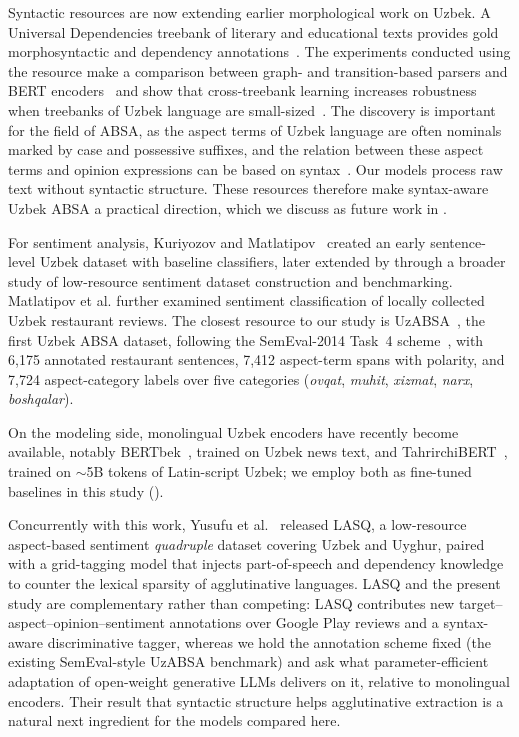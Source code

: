 \documentclass[bdcc,article,submit,moreauthors]{Definitions/mdpi}
\begin{document}
Syntactic resources are now extending earlier morphological work on Uzbek. A Universal Dependencies treebank of literary and educational texts provides gold morphosyntactic and dependency annotations~\cite{MATLATIPOV2026112857}. The experiments conducted using the resource make a comparison between graph- and transition-based parsers and BERT encoders~\cite{11632281} and show that cross-treebank learning increases robustness when treebanks of Uzbek language are small-sized~\cite{10.1007/978-3-032-29532-3_15}. The discovery is important for the field of ABSA, as the aspect terms of Uzbek language are often nominals marked by case and possessive suffixes, and the relation between these aspect terms and opinion expressions can be based on syntax~\cite{Yusufu2026}. Our models process raw text without syntactic structure. These resources therefore make syntax-aware Uzbek ABSA a practical direction, which we discuss as future work in .

For sentiment analysis, Kuriyozov and Matlatipov~\cite{proceedings2019021037} created an early sentence-level Uzbek dataset with baseline classifiers, later extended by \cite{kuriyozov2022construction} through a broader study of low-resource sentiment dataset construction and benchmarking. Matlatipov et al.\cite{Matlatipov2022-yd} further examined sentiment classification of locally collected Uzbek restaurant reviews. The closest resource to our study is UzABSA~\cite{matlatipov-etal-2024-uzabsa}, the first Uzbek ABSA dataset, following the SemEval-2014 Task~4 scheme~\cite{pontiki-etal-2014-semeval}, with 6{,}175 annotated restaurant sentences, 7{,}412 aspect-term spans with polarity, and 7{,}724 aspect-category labels over five categories (\textit{ovqat}, \textit{muhit}, \textit{xizmat}, \textit{narx}, \textit{boshqalar}).

On the modeling side, monolingual Uzbek encoders have recently become available, notably BERTbek~\cite{kuriyozov-etal-2024-bertbek}, trained on Uzbek news text, and TahrirchiBERT~\cite{tahrirchibert2023}, trained on $\sim$5B tokens of Latin-script Uzbek; we employ both as fine-tuned baselines in this study ().

Concurrently with this work, Yusufu et al.~\cite{Yusufu2026} released LASQ, a low-resource aspect-based sentiment \emph{quadruple} dataset covering Uzbek and Uyghur, paired with a grid-tagging model that injects part-of-speech and dependency knowledge to counter the lexical sparsity of agglutinative languages. LASQ and the present study are complementary rather than competing: LASQ contributes new target--aspect--opinion--sentiment annotations over Google Play reviews and a syntax-aware discriminative tagger, whereas we hold the annotation scheme fixed (the existing SemEval-style UzABSA benchmark) and ask what parameter-efficient adaptation of open-weight generative LLMs delivers on it, relative to monolingual encoders. Their result that syntactic structure helps agglutinative extraction is a natural next ingredient for the models compared here.
\end{document}
